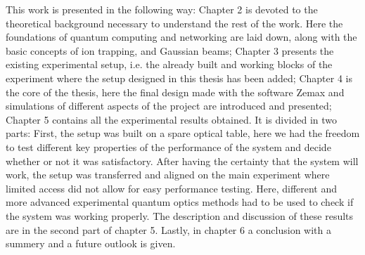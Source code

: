 \documentclass[english, a4paper, 12pt, twoside]{book}
\numberwithin{equation}{section} %
\begin{document}
This work is presented in the following way: Chapter 2 is devoted to the theoretical background necessary to understand the rest of the work. Here the foundations of quantum computing and networking are laid down, along with the basic concepts of ion trapping, and Gaussian beams; Chapter 3 presents the existing experimental setup, i.e. the already built and working blocks of the experiment where the setup designed in this thesis has been added; Chapter 4 is the core of the thesis, here the final design made with the software Zemax and simulations of different aspects of the project are introduced and presented;
Chapter 5 contains all the experimental results obtained. It is divided in two parts: First, the setup was built on a spare optical table, here we had the freedom to test different key properties of the performance of the system and decide whether or not it was satisfactory. After having the certainty that the system will work, the setup was transferred and aligned on the main experiment where limited access did not allow for easy performance testing. Here, different and more advanced experimental quantum optics methods had to be used to check if the system was working properly. The description and discussion of these results are in the second part of chapter 5. Lastly, in chapter 6 a conclusion with a summery and a future outlook is given.













\newpage






\end{document}
